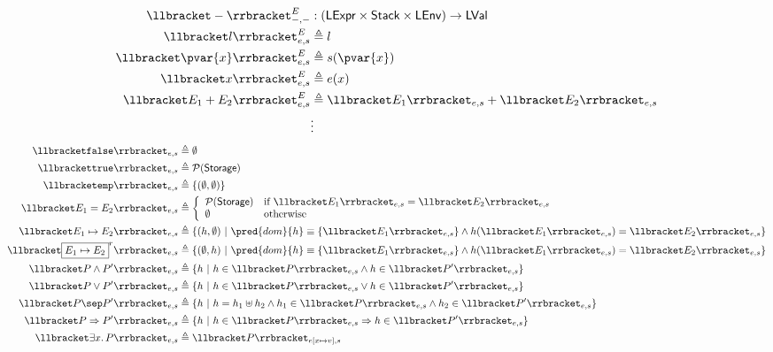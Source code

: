 \begin{align*}
\llbracket - \rrbracket_{-, -}^E &: (\mathsf{LExpr} \times \mathsf{Stack} \times \mathsf{LEnv}) \rightarrow \mathsf{LVal} \\
\llbracket l \rrbracket_{e, s}^E &\triangleq l \\
\llbracket \pvar{x} \rrbracket_{e, s}^E &\triangleq s(\pvar{x}) \\
\llbracket x \rrbracket_{e, s}^E &\triangleq e(x) \\
\llbracket E_1 + E_2 \rrbracket_{e, s}^E &\triangleq \llbracket E_1 \rrbracket_{e, s} + \llbracket E_2 \rrbracket_{e, s} \\
&\vdots
\end{align*}
\begin{align*}
\llbracket \mathtt{false} \rrbracket_{e, s} &\triangleq \emptyset \\
\llbracket \mathtt{true} \rrbracket_{e, s} &\triangleq \mathcal{P}(\mathsf{Storage}) \\
\llbracket \mathtt{emp} \rrbracket_{e, s} &\triangleq \{ (\emptyset, \emptyset) \} \\
\llbracket E_1 = E_2 \rrbracket_{e, s} &\triangleq \bigg\{ \begin{array}{l l}
\mathcal{P}(\mathsf{Storage}) & \text{if } \llbracket E_1 \rrbracket_{e, s} = \llbracket E_2 \rrbracket_{e, s} \\
\emptyset & \text{otherwise}
\end{array} \\
\llbracket E_1 \mapsto E_2 \rrbracket_{e, s} &\triangleq \{ (h, \emptyset)\ |\ \pred{dom}{h} \equiv \{ \llbracket E_1 \rrbracket_{e, s} \} \land h(\llbracket E_1 \rrbracket_{e, s}) = \llbracket E_2 \rrbracket_{e, s} \} \\
\llbracket \boxed{E_1 \mapsto E_2}^r \rrbracket_{e, s} &\triangleq \{ (\emptyset, h)\ |\ \pred{dom}{h} \equiv \{ \llbracket E_1 \rrbracket_{e, s} \} \land h(\llbracket E_1 \rrbracket_{e, s}) = \llbracket E_2 \rrbracket_{e, s} \} \\
\llbracket P \land P' \rrbracket_{e, s} &\triangleq \{ h\ |\ h \in \llbracket P \rrbracket_{e, s} \land h \in \llbracket P' \rrbracket_{e, s} \} \\
\llbracket P \lor P' \rrbracket_{e, s} &\triangleq \{ h\ |\ h \in \llbracket P \rrbracket_{e, s} \lor h \in \llbracket P' \rrbracket_{e, s} \} \\
\llbracket P \sep P' \rrbracket_{e, s} &\triangleq \{ h\ |\ h = h_1 \uplus h_2 \land h_1 \in \llbracket P \rrbracket_{e, s} \land h_2 \in \llbracket P' \rrbracket_{e, s} \} \\
\llbracket P \Rightarrow P' \rrbracket_{e, s} &\triangleq \{ h\ |\ h \in \llbracket P \rrbracket_{e, s} \Rightarrow h \in \llbracket P' \rrbracket_{e, s} \} \\
\llbracket \exists x \ldotp P \rrbracket_{e, s} &\triangleq \llbracket P \rrbracket_{e[x \mapsto v], s}
\end{align*}
\fi

